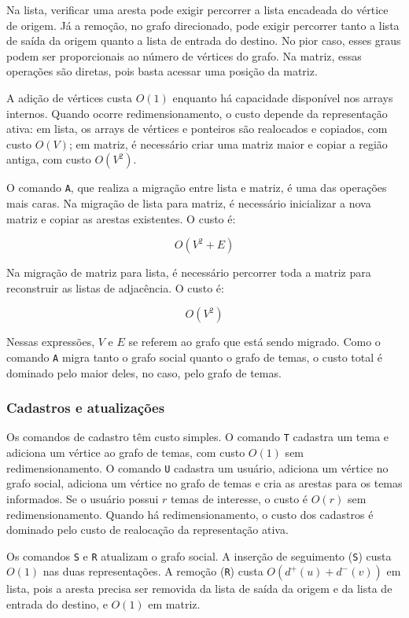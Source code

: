 \documentclass[12pt,a4paper]{article}
\begin{document}
Na lista, verificar uma aresta pode exigir percorrer a lista encadeada do vértice
de origem. Já a remoção, no grafo direcionado, pode exigir percorrer tanto a lista de
saída da origem quanto a lista de entrada do destino. No pior caso, esses graus podem ser
proporcionais ao número de vértices do grafo. Na matriz, essas operações são diretas,
pois basta acessar uma posição da matriz.

A adição de vértices custa $O(1)$ enquanto há capacidade disponível nos arrays internos.
Quando ocorre redimensionamento, o custo depende da representação ativa: em lista, os
arrays de vértices e ponteiros são realocados e copiados, com custo $O(V)$; em matriz, é
necessário criar uma matriz maior e copiar a região antiga, com custo $O(V^2)$.

O comando \texttt{A}, que realiza a migração entre lista e matriz, é uma das operações
mais caras. Na migração de lista para matriz, é necessário inicializar a nova matriz e copiar
as arestas existentes. O custo é:

\[
O(V^2 + E)
\]

Na migração de matriz para lista, é necessário percorrer toda a matriz para reconstruir as
listas de adjacência. O custo é:

\[
O(V^2)
\]

Nessas expressões, $V$ e $E$ se referem ao grafo que está sendo migrado. Como o comando
\texttt{A} migra tanto o grafo social quanto o grafo de temas, o custo total é dominado
pelo maior deles, no caso, pelo grafo de temas.

\subsubsection{Cadastros e atualizações}

Os comandos de cadastro têm custo simples. O comando \texttt{T} cadastra
um tema e adiciona um vértice ao grafo de temas, com custo $O(1)$ sem redimensionamento.
O comando \texttt{U} cadastra um usuário, adiciona um vértice no grafo social, adiciona
um vértice no grafo de temas e cria as arestas para os temas informados. Se o usuário
possui $r$ temas de interesse, o custo é $O(r)$ sem redimensionamento. Quando há
redimensionamento, o custo dos cadastros é dominado pelo custo de realocação da
representação ativa.

Os comandos \texttt{S} e \texttt{R} atualizam o grafo social. A inserção de seguimento
(\texttt{S}) custa $O(1)$ nas duas representações. A remoção (\texttt{R}) custa $O(d^+(u) + d^-(v))$ em lista, pois a aresta precisa ser
removida da lista de saída da origem e da lista de entrada do destino, e $O(1)$ em matriz.
\end{document}
